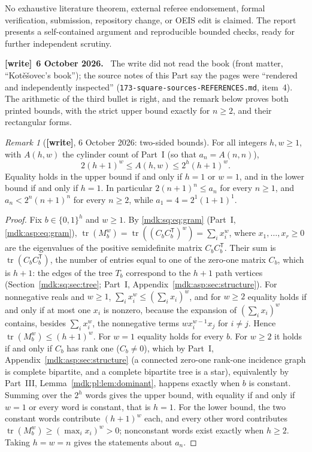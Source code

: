 \documentclass[11pt,letterpaper]{article}
\numberwithin{equation}{section}
\theoremstyle{remark}\newtheorem{remark}[theorem]{Remark}
\DeclareMathOperator{\tr}{tr}\DeclareMathOperator{\TV}{TV}
\newcommand{\file}[1]{\nolinkurl{#1}}
\newenvironment{writenote}[1][]{\par\smallskip\begingroup\small
 \noindent\textbf{[write]}\if\relax\detokenize{#1}\relax\else~\textbf{#1.}\fi\ }%
 {\par\endgroup\smallskip}
\newcommand{\wtag}{\textup{\textbf{[write]}}}
\begin{document}
No exhaustive literature theorem, external referee endorsement, formal verification, submission, repository change, or OEIS edit is claimed. The report presents a self-contained argument and reproducible bounded checks, ready for further independent scrutiny.
\begin{writenote}[6 October 2026]
The write did not read the book (front matter, ``Kot\v e\v sovec's book''); the source notes of this Part say the pages were ``rendered and independently inspected'' (\file{173-square-sources-REFERENCES.md}, item~4). The arithmetic of the third bullet is right, and the remark below proves both printed bounds, with the strict upper bound exactly for $n\ge2$, and their rectangular forms.
\end{writenote}
\begin{remark}[\wtag, 6 October 2026: two-sided bounds]\label{mdk:sq:rem:book-bounds}
For all integers $h,w\ge1$, with $A(h,w)$ the cylinder count of Part~I (so that $a_n=A(n,n)$),
\[
2(h+1)^w\le A(h,w)\le2^h(h+1)^w .
\]
Equality holds in the upper bound if and only if $h=1$ or $w=1$, and in the lower bound if and only if $h=1$. In particular $2(n+1)^n\le a_n$ for every $n\ge1$, and $a_n<2^n(n+1)^n$ for every $n\ge2$, while $a_1=4=2^1(1+1)^1$.
\end{remark}
\begin{proof}
Fix $b\in\{0,1\}^h$ and $w\ge1$. By \eqref{mdk:sq:eq:gram} (Part~I, \eqref{mdk:asp:eq:gram}), $\tr(M_b^w)=\tr((C_bC_b^{\mathsf T})^w)=\sum_ix_i^w$, where $x_1,\dots,x_r\ge0$ are the eigenvalues of the positive semidefinite matrix $C_bC_b^{\mathsf T}$. Their sum is $\tr(C_bC_b^{\mathsf T})$, the number of entries equal to one of the zero-one matrix $C_b$, which is $h+1$: the edges of the tree $T_b$ correspond to the $h+1$ path vertices (Section~\ref{mdk:sq:sec:tree}; Part~I, Appendix~\ref{mdk:asp:sec:structure}). For nonnegative reals and $w\ge1$, $\sum_ix_i^w\le(\sum_ix_i)^w$, and for $w\ge2$ equality holds if and only if at most one $x_i$ is nonzero, because the expansion of $(\sum_ix_i)^w$ contains, besides $\sum_ix_i^w$, the nonnegative terms $wx_i^{w-1}x_j$ for $i\ne j$. Hence $\tr(M_b^w)\le(h+1)^w$. For $w=1$ equality holds for every $b$. For $w\ge2$ it holds if and only if $C_b$ has rank one ($C_b\ne0$), which by Part~I, Appendix~\ref{mdk:asp:sec:structure} (a connected zero-one rank-one incidence graph is complete bipartite, and a complete bipartite tree is a star), equivalently by Part~III, Lemma~\ref{mdk:pl:lem:dominant}, happens exactly when $b$ is constant. Summing over the $2^h$ words gives the upper bound, with equality if and only if $w=1$ or every word is constant, that is $h=1$. For the lower bound, the two constant words contribute $(h+1)^w$ each, and every other word contributes $\tr(M_b^w)\ge(\max_ix_i)^w>0$; nonconstant words exist exactly when $h\ge2$. Taking $h=w=n$ gives the statements about $a_n$.
\end{proof}
\end{document}
